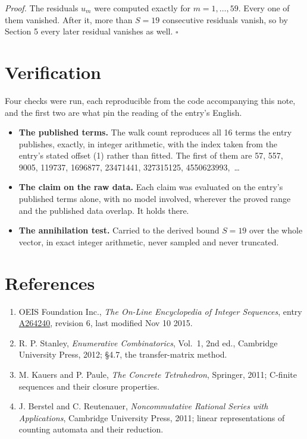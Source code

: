 \documentclass[11pt]{article}
\theoremstyle{definition}
\begin{document}
{\itshape Proof.} The residuals $u_m$ were computed exactly for $m = 1,\dots,59$. Every one of them vanished. After it, more than $S = 19$ consecutive residuals vanish, so by Section 5 every later residual vanishes as well. $\square$

\section{Verification}

Four checks were run, each reproducible from the code accompanying this note, and the first two are what pin the reading of the entry's English.

\begin{itemize}

\item {\bfseries The published terms.} The walk count reproduces all 16 terms the entry publishes, exactly, in integer arithmetic, with the index taken from the entry's stated offset (1) rather than fitted. The first of them are 57, 557, 9005, 119737, 1696877, 23471441, 327315125, 4550623993,~\dots

\item {\bfseries The claim on the raw data.} Each claim was evaluated on the entry's published terms alone, with no model involved, wherever the proved range and the published data overlap. It holds there.

\item {\bfseries The annihilation test.} Carried to the derived bound $S = 19$ over the whole vector, in exact integer arithmetic, never sampled and never truncated.

\end{itemize}

\section{References}

\begin{enumerate}

\item OEIS Foundation Inc., \emph{The On-Line Encyclopedia of Integer Sequences}, entry \href{https://oeis.org/A264240}{A264240}, revision 6, last modified Nov 10 2015.

\item R. P. Stanley, \emph{Enumerative Combinatorics}, Vol.~1, 2nd ed., Cambridge University Press, 2012; \S4.7, the transfer-matrix method.

\item M. Kauers and P. Paule, \emph{The Concrete Tetrahedron}, Springer, 2011; C-finite sequences and their closure properties.

\item J. Berstel and C. Reutenauer, \emph{Noncommutative Rational Series with Applications}, Cambridge University Press, 2011; linear representations of counting automata and their reduction.

\end{enumerate}
\end{document}
